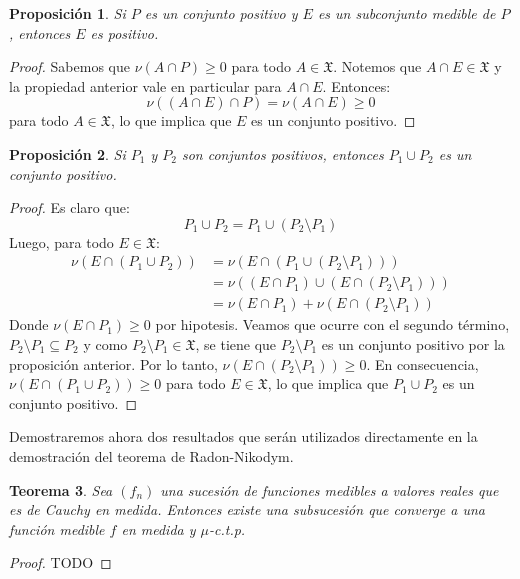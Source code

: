 \documentclass[12pt,a4paper]{article}
\theoremstyle{profesional}
\newtheorem{teorema}{Teorema}[section]
\newtheorem{proposicion}[teorema]{Proposición}
\theoremstyle{definicion-style}
\newcommand{\X}{\mathfrak{X}}
\begin{document}
\begin{proposicion}
    Si \( P \) es un conjunto positivo y \( E \) es un subconjunto medible de \( P \), entonces \( E \) es positivo.
\end{proposicion}
\begin{proof}
    Sabemos que \( \nu(A \cap P) \geq 0 \) para todo \( A \in \X \). Notemos que \( A \cap E \in \X \) y la propiedad anterior vale en particular para \( A \cap E \). Entonces: \[
        \nu((A \cap E) \cap P) = \nu(A \cap E) \geq 0
    \]
    para todo \( A \in \X \), lo que implica que \( E \) es un conjunto positivo.
\end{proof}

\begin{proposicion}
    Si \( P_1 \) y \( P_2 \) son conjuntos positivos, entonces \( P_1 \cup P_2 \) es un conjunto positivo.
\end{proposicion}
\begin{proof}
    Es claro que:
    \[
        P_1 \cup P_2 = P_1 \cup (P_2 \setminus P_1)
    \]
    Luego, para todo \( E \in \X \):\begin{align*}
        \nu(E \cap (P_1 \cup P_2)) & = \nu(E \cap (P_1 \cup (P_2 \setminus P_1)))          \\
                                   & = \nu((E \cap P_1) \cup (E \cap (P_2 \setminus P_1))) \\
                                   & = \nu(E \cap P_1) + \nu(E \cap (P_2 \setminus P_1))
    \end{align*}
    Donde \( \nu(E \cap P_1) \geq 0 \) por hipotesis. Veamos que ocurre con el segundo término, \( P_2 \setminus P_1 \subseteq P_2 \) y como \( P_2 \setminus P_1 \in \X \), se tiene que
    \( P_2 \setminus P_1 \) es un conjunto positivo por la proposición anterior. Por lo tanto, \( \nu(E \cap (P_2 \setminus P_1)) \geq 0 \). En consecuencia, \( \nu(E \cap (P_1 \cup P_2)) \geq 0 \) para todo \( E \in \X \), lo que implica que \( P_1 \cup P_2 \) es un conjunto positivo.
\end{proof}

Demostraremos ahora dos resultados que serán utilizados directamente en la demostración del teorema de Radon-Nikodym.

\begin{teorema}\label{teo:convergencia_en_medida}
    Sea \( (f_n) \) una sucesión de funciones medibles a valores reales que es de Cauchy en medida. Entonces existe una subsucesión que converge a una función medible \( f \) en medida y \( \mu \)-c.t.p.
\end{teorema}
\begin{proof}
    TODO
\end{proof}
\end{document}
